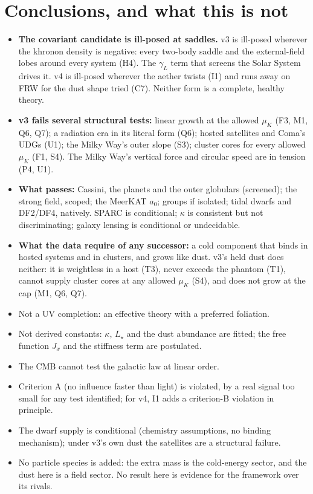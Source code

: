 \documentclass[10pt]{article}
\begin{document}
\section{Conclusions, and what this is not}
\begin{itemize}
\item \textbf{The covariant candidate is ill-posed at saddles.} v3 is ill-posed wherever the khronon density is negative: every two-body saddle and the external-field lobes around every system (H4). The $\gamma_L$ term that screens the Solar System drives it. v4 is ill-posed wherever the aether twists (I1) and runs away on FRW for the dust shape tried (C7). Neither form is a complete, healthy theory.
\item \textbf{v3 fails several structural tests:} linear growth at the allowed $\mu_K$ (F3, M1, Q6, Q7); a radiation era in its literal form (Q6); hosted satellites and Coma's UDGs (U1); the Milky Way's outer slope (S3); cluster cores for every allowed $\mu_K$ (F1, S4). The Milky Way's vertical force and circular speed are in tension (P4, U1).
\item \textbf{What passes:} Cassini, the planets and the outer globulars (screened); the strong field, scoped; the MeerKAT $a_0$; groups if isolated; tidal dwarfs and DF2/DF4, natively. SPARC is conditional; $\kappa$ is consistent but not discriminating; galaxy lensing is conditional or undecidable.
\item \textbf{What the data require of any successor:} a cold component that binds in hosted systems and in clusters, and grows like dust. v3's held dust does neither: it is weightless in a host (T3), never exceeds the phantom (T1), cannot supply cluster cores at any allowed $\mu_K$ (S4), and does not grow at the cap (M1, Q6, Q7).
\item Not a UV completion: an effective theory with a preferred foliation.
\item Not derived constants: $\kappa$, $L_\star$ and the dust abundance are fitted; the free function $J_x$ and the stiffness term are postulated.
\item The CMB cannot test the galactic law at linear order.
\item Criterion A (no influence faster than light) is violated, by a real signal too small for any test identified; for v4, I1 adds a criterion-B violation in principle.
\item The dwarf supply is conditional (chemistry assumptions, no binding mechanism); under v3's own dust the satellites are a structural failure.
\item No particle species is added: the extra mass is the cold-energy sector, and the dust here is a field sector. No result here is evidence for the framework over its rivals.
\end{itemize}
\end{document}
